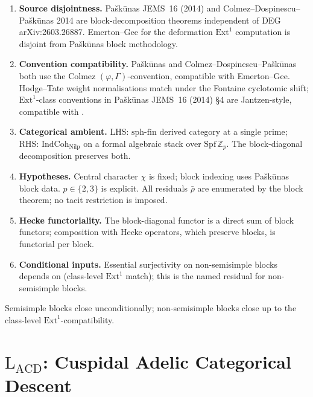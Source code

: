 \begin{enumerate}
\item \textbf{Source disjointness.} Pa{\v s}k{\=u}nas JEMS~16 (2014)
and Colmez--Dospinescu--Pa{\v s}k{\=u}nas 2014
are block-decomposition theorems independent of
DEG arXiv:2603.26887. Emerton--Gee for the deformation \(\mathrm{Ext}^{1}\)
computation is disjoint from Pa{\v s}k{\=u}nas block methodology.

\item \textbf{Convention compatibility.} Pa{\v s}k{\=u}nas and
Colmez--Dospinescu--Pa{\v s}k{\=u}nas both use the Colmez
\((\varphi,\Gamma)\)-convention, compatible with Emerton--Gee.
Hodge--Tate weight normalisations match under the Fontaine cyclotomic
shift; \(\mathrm{Ext}^{1}\)-class conventions in Pa{\v s}k{\=u}nas
JEMS~16 (2014) \S 4 are Jantzen-style, compatible with
.

\item \textbf{Categorical ambient.} LHS: \(\mathrm{sph\text{-}fin}\)
derived category at a single prime; RHS:
\(\mathrm{IndCoh}_{\mathrm{Nilp}}\) on a formal algebraic stack over
\(\mathrm{Spf}\,\mathbb{Z}_{p}\). The block-diagonal decomposition
preserves both.

\item \textbf{Hypotheses.} Central character \(\chi\) is
fixed; block indexing uses Pa{\v s}k{\=u}nas block data.
\(p\in\{2,3\}\) is explicit. All residuals \(\bar\rho\) are enumerated
by the block theorem; no tacit restriction is imposed.

\item \textbf{Hecke functoriality.} The block-diagonal functor
is a direct sum of block functors; composition with Hecke operators,
which preserve blocks, is functorial per block.

\item \textbf{Conditional inputs.} Essential surjectivity on
non-semisimple blocks depends on
 (class-level
\(\mathrm{Ext}^{1}\) match); this is the named residual
for non-semisimple blocks.
\end{enumerate}

Semisimple blocks close unconditionally; non-semisimple blocks close
up to the class-level \(\mathrm{Ext}^{1}\)-compatibility.

\section{\(\mathrm{L}_{\mathrm{ACD}}\): Cuspidal Adelic Categorical Descent}
\label{v4-arith:w5-e:lacd}

